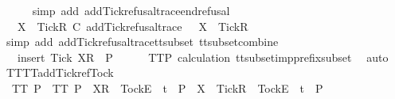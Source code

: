 \begin{isabellebody}
\ \ \ \ \isamarkupfalse%
\ {\isacharparenleft}simp\ add{\isacharcolon}\ add{\isacharunderscore}Tick{\isacharunderscore}refusal{\isacharunderscore}trace{\isacharunderscore}end{\isacharunderscore}refusal{\isacharparenright}\isanewline
\ \ \isamarkupfalse%
\ \isamarkupfalse%
\ {\isachardoublequoteopen}{\isasymrho}\ {\isacharat}\ {\isacharbrackleft}{\isacharbrackleft}X\ {\isasymunion}\ {\isacharbraceleft}Tick{\isacharbraceright}{\isacharbrackright}\isactrlsub R{\isacharbrackright}\ {\isasymsubseteq}\isactrlsub C\ add{\isacharunderscore}Tick{\isacharunderscore}refusal{\isacharunderscore}trace\ {\isasymrho}\ {\isacharat}\ {\isacharbrackleft}{\isacharbrackleft}X\ {\isasymunion}\ {\isacharbraceleft}Tick{\isacharbraceright}{\isacharbrackright}\isactrlsub R{\isacharbrackright}{\isachardoublequoteclose}\isanewline
\ \ \ \ \isamarkupfalse%
\ {\isacharparenleft}simp\ add{\isacharcolon}\ add{\isacharunderscore}Tick{\isacharunderscore}refusal{\isacharunderscore}trace{\isacharunderscore}tt{\isacharunderscore}subset\ tt{\isacharunderscore}subset{\isacharunderscore}combine{\isacharparenright}\isanewline
\ \ \isamarkupfalse%
\ \isamarkupfalse%
\ {\isachardoublequoteopen}{\isasymrho}\ {\isacharat}\ {\isacharbrackleft}{\isacharbrackleft}insert\ Tick\ X{\isacharbrackright}\isactrlsub R{\isacharbrackright}\ {\isasymin}\ P{\isachardoublequoteclose}\isanewline
\ \ \ \ \isamarkupfalse%
\ TT{}{\isacharunderscore}P\ calculation\ tt{\isacharunderscore}subset{\isacharunderscore}imp{\isacharunderscore}prefix{\isacharunderscore}subset\ \isamarkupfalse%
\ auto\isanewline
{}\isamarkupfalse%
%
\endisatagproof
{\isafoldproof}%
%
\isadelimproof
\isanewline
%
\endisadelimproof
\isanewline
{}\isamarkupfalse%
\ TT{}{\isacharunderscore}TT{}{\isacharunderscore}add{\isacharunderscore}Tick{\isacharunderscore}ref{\isacharunderscore}Tock{\isacharcolon}\isanewline
\ \ {\isachardoublequoteopen}TT{}\ P\ {\isasymLongrightarrow}\ TT{}\ P\ {\isasymLongrightarrow}\ {\isacharbrackleft}X{\isacharbrackright}\isactrlsub R\ {\isacharhash}\ {\isacharbrackleft}Tock{\isacharbrackright}\isactrlsub E\ {\isacharhash}\ t\ {\isasymin}\ P\ {\isasymLongrightarrow}\ {\isacharbrackleft}X\ {\isasymunion}\ {\isacharbraceleft}Tick{\isacharbraceright}{\isacharbrackright}\isactrlsub R\ {\isacharhash}\ {\isacharbrackleft}Tock{\isacharbrackright}\isactrlsub E\ {\isacharhash}\ t\ {\isasymin}\ P{\isachardoublequoteclose}\isanewline

\end{isabellebody}
